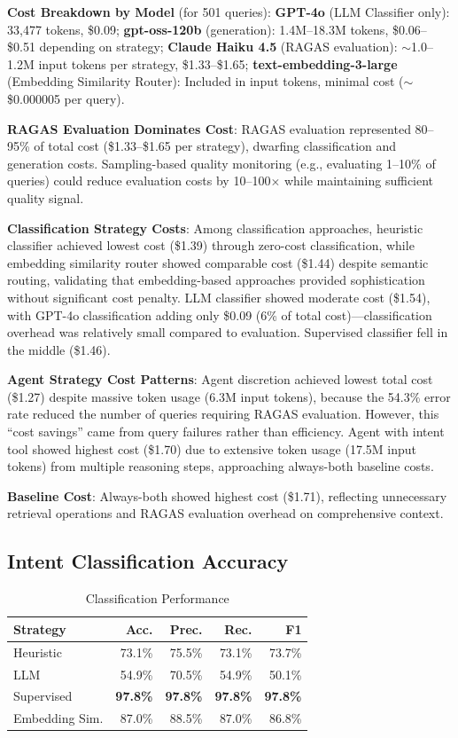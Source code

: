 \documentclass[twocolumn,10pt]{article}
\begin{document}
\textbf{Cost Breakdown by Model} (for 501 queries): \textbf{GPT-4o} (LLM Classifier only): 33,477 tokens, \$0.09; \textbf{gpt-oss-120b} (generation): 1.4M--18.3M tokens, \$0.06--\$0.51 depending on strategy; \textbf{Claude Haiku 4.5} (RAGAS evaluation): $\sim$1.0--1.2M input tokens per strategy, \$1.33--\$1.65; \textbf{text-embedding-3-large} (Embedding Similarity Router): Included in input tokens, minimal cost ($\sim$\$0.000005 per query).

\textbf{RAGAS Evaluation Dominates Cost}: RAGAS evaluation represented 80--95\% of total cost (\$1.33--\$1.65 per strategy), dwarfing classification and generation costs. Sampling-based quality monitoring (e.g., evaluating 1--10\% of queries) could reduce evaluation costs by 10--100$\times$ while maintaining sufficient quality signal.

\textbf{Classification Strategy Costs}: Among classification approaches, heuristic classifier achieved lowest cost (\$1.39) through zero-cost classification, while embedding similarity router showed comparable cost (\$1.44) despite semantic routing, validating that embedding-based approaches provided sophistication without significant cost penalty. LLM classifier showed moderate cost (\$1.54), with GPT-4o classification adding only \$0.09 (6\% of total cost)---classification overhead was relatively small compared to evaluation. Supervised classifier fell in the middle (\$1.46).

\textbf{Agent Strategy Cost Patterns}: Agent discretion achieved lowest total cost (\$1.27) despite massive token usage (6.3M input tokens), because the 54.3\% error rate reduced the number of queries requiring RAGAS evaluation. However, this ``cost savings'' came from query failures rather than efficiency. Agent with intent tool showed highest cost (\$1.70) due to extensive token usage (17.5M input tokens) from multiple reasoning steps, approaching always-both baseline costs.

\textbf{Baseline Cost}: Always-both showed highest cost (\$1.71), reflecting unnecessary retrieval operations and RAGAS evaluation overhead on comprehensive context.

\subsection{Intent Classification Accuracy}

\begin{table}[h]
\centering
\caption{Classification Performance}
\footnotesize
\begin{tabular}{lrrrr}
\toprule
Strategy & Acc. & Prec. & Rec. & F1 \\
\midrule
Heuristic & 73.1\% & 75.5\% & 73.1\% & 73.7\% \\
LLM & 54.9\% & 70.5\% & 54.9\% & 50.1\% \\
Supervised & \textbf{97.8\%} & \textbf{97.8\%} & \textbf{97.8\%} & \textbf{97.8\%} \\
Embedding Sim. & 87.0\% & 88.5\% & 87.0\% & 86.8\% \\
\bottomrule
\end{tabular}
\end{table}
\end{document}
